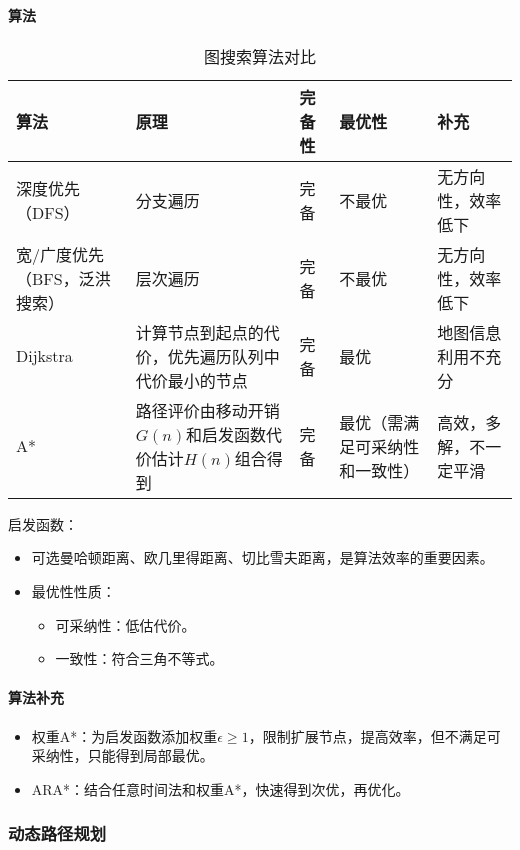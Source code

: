 \documentclass[
12pt, %
a4paper, 
oneside, %
headinclude,footinclude, %
]{scrartcl}
\begin{document}
\paragraph{算法}
\begin{table}[H]
\centering
\begin{tabular}{|p{2cm}|p{5.5cm}|p{1.4cm}|p{3.5cm}|p{2.5cm}|}
\hline
算法 & 原理 & 完备性 & 最优性 & 补充 \\
\hline
深度优先（DFS） & 分支遍历 & 完备 & 不最优 & 无方向性，效率低下 \\
\hline
宽/广度优先（BFS，泛洪搜索） & 层次遍历 & 完备 & 不最优 & 无方向性，效率低下 \\
\hline
Dijkstra & 计算节点到起点的代价，优先遍历队列中代价最小的节点 & 完备 & 最优 & 地图信息利用不充分 \\
\hline
A* & 路径评价由移动开销$ G(n) $和启发函数代价估计$ H(n) $组合得到 & 完备 & 最优（需满足可采纳性和一致性） & 高效，多解，不一定平滑 \\
\hline
\end{tabular}
\caption{图搜索算法对比}
\end{table}

启发函数：
\begin{itemize}
\item 可选曼哈顿距离、欧几里得距离、切比雪夫距离，是算法效率的重要因素。
\item 最优性性质：
\begin{itemize}
\item 可采纳性：低估代价。
\item 一致性：符合三角不等式。
\end{itemize}
\end{itemize}
\paragraph{算法补充}
\begin{itemize}
\item 权重A*：为启发函数添加权重$ \epsilon \geq 1 $，限制扩展节点，提高效率，但不满足可采纳性，只能得到局部最优。
\item ARA*：结合任意时间法和权重A*，快速得到次优，再优化。
\end{itemize}
\subsubsection[动态路径规划]{动态路径规划}
\end{document}
